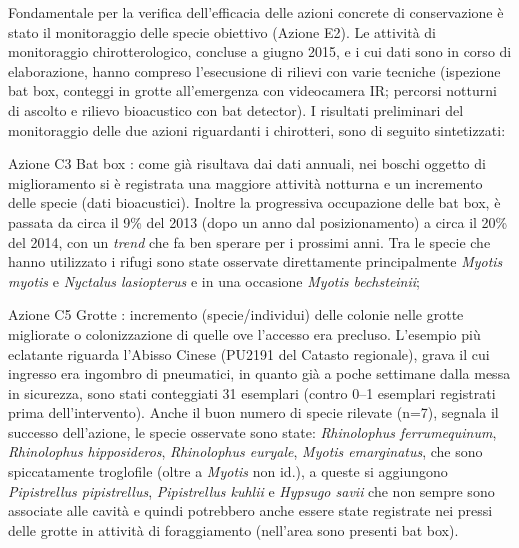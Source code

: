 {Fondamentale per la verifica dell’efficacia delle azioni concrete di conservazione è stato il monitoraggio delle specie obiettivo (Azione E2). Le attività di monitoraggio chirotterologico, concluse a giugno 2015, e i cui dati sono in corso di elaborazione, hanno compreso l'esecusione di rilievi con varie tecniche (ispezione bat box, conteggi in grotte all’emergenza con videocamera IR; percorsi notturni di ascolto e rilievo bioacustico con bat detector). I risultati preliminari del monitoraggio delle due azioni riguardanti i chirotteri, sono di seguito sintetizzati:
\begin{compactdesc}
\item[Azione C3 Bat box]: come già risultava dai dati annuali, nei boschi oggetto di miglioramento si è registrata una maggiore attività notturna e un incremento delle specie (dati bioacustici). Inoltre la progressiva occupazione delle bat box, è passata da circa il 9\% del 2013 (dopo un anno dal posizionamento) a circa il 20\% del 2014, con un \textit{trend} che fa ben sperare per i prossimi anni. Tra le specie che hanno utilizzato i rifugi sono state osservate direttamente principalmente \emph{Myotis myotis} e \emph{Nyctalus lasiopterus} e in una occasione \emph{Myotis bechsteinii};
\item[Azione C5 Grotte]: incremento (specie/individui) delle colonie nelle grotte migliorate o colonizzazione di quelle ove l’accesso era precluso. L’esempio più eclatante riguarda l’Abisso Cinese (PU2191 del Catasto regionale), grava il cui ingresso era ingombro di pneumatici, in quanto già a poche settimane dalla messa in sicurezza, sono stati conteggiati 31 esemplari (contro 0--1 esemplari registrati prima dell’intervento). Anche il buon numero di specie rilevate (n=7), segnala il successo dell’azione, le specie osservate sono state: \emph{Rhinolophus ferrumequinum}, \emph{Rhinolophus hipposideros}, \emph{Rhinolophus euryale}, \emph{Myotis emarginatus}, che sono spiccatamente troglofile (oltre a \emph{Myotis} non id.), a queste si aggiungono \emph{Pipistrellus pipistrellus}, \emph{Pipistrellus kuhlii} e \emph{Hypsugo savii} che non sempre sono associate alle cavità e quindi potrebbero anche essere state registrate nei pressi delle grotte in attività di foraggiamento (nell’area sono presenti bat box).
\end{compactdesc}

}
